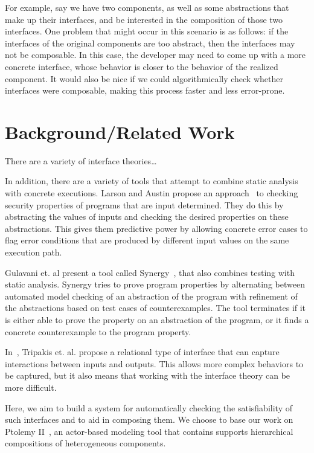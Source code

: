 \documentclass[preprint,11pt]{sigplanconf}
\begin{document}
For example, say we have two components, as well as some abstractions that
make up their interfaces, and be interested in the composition of those two
interfaces. One problem that might occur in this scenario is as follows: if the
interfaces of the original components are too abstract, then the interfaces
may not be composable. In this case, the developer may need to come up with a
more concrete interface, whose behavior is closer to the behavior of the
realized component. It would also be nice if we could algorithmically check
whether interfaces were composable, making this process faster and less
error-prone.

\section{Background/Related Work}
There are a variety of interface theories\ldots
{} %

In addition, there are a variety of tools that attempt to combine static analysis
with concrete executions.
%
Larson and Austin propose an approach~\cite{larsonAustin:2003:coverageDetection} 
to checking security properties of programs that are input determined.  They do
this by abstracting the values of inputs and checking the desired properties on
these abstractions. This gives them predictive power by allowing concrete error
cases to flag error conditions that are produced by different input values on the
same execution path.

Gulavani et. al present a tool called Synergy~\cite{gulavani:synergy}, that
also combines testing with static analysis.  Synergy tries to prove program
properties by alternating between automated model checking of an abstraction of
the program with refinement of the abstractions based on test cases of
counterexamples.  The tool terminates if it is either able to prove the property
on an abstraction of the program, or it finds a concrete counterexample to the
program property.

In~\cite{relationalInterfaces}, Tripakis et. al. propose a relational type of
interface that can capture interactions between inputs and outputs.
This allows more complex behaviors to be captured, but it also means that
working with the interface theory can be more difficult.

Here, we aim to build a system for automatically checking the satisfiability
of such interfaces and to aid in composing them.
We choose to base our work on Ptolemy II~\cite{ptII}, an actor-based modeling
tool that contains supports hierarchical compositions of heterogeneous components.
\end{document}
